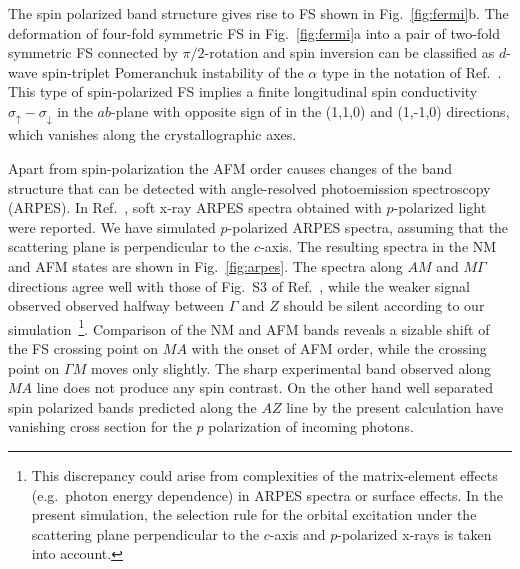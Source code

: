 \documentclass[reprint,twocolumn,superscriptaddress,secnumarabic,amssymb, nobibnotes, aps, prb]{revtex4-1}
\begin{document}
The spin polarized band structure gives rise to FS shown
in Fig.~\ref{fig:fermi}b. The deformation of four-fold symmetric FS
in Fig.~\ref{fig:fermi}a into a pair of two-fold symmetric FS connected
by $\pi/2$-rotation and spin inversion can be classified as
$d$-wave spin-triplet Pomeranchuk instability of the $\alpha$ 
type in the notation of Ref.~. This type of spin-polarized FS
implies a finite longitudinal spin conductivity $\sigma_{\uparrow}-\sigma_{\downarrow}$ in the $ab$-plane with opposite sign of in the (1,1,0) and (1,-1,0) directions, which vanishes
along the crystallographic axes.

Apart from spin-polarization the AFM order causes changes of the band structure that can be detected with angle-resolved photoemission spectroscopy (ARPES). In Ref.~, soft x-ray ARPES spectra obtained with $p$-polarized light were reported. We have simulated $p$-polarized ARPES spectra, assuming that the scattering plane is perpendicular to the $c$-axis. The resulting spectra in the NM and AFM states are shown in Fig.~\ref{fig:arpes}. The spectra along $AM$ and $M\Gamma$ directions agree well with those of Fig.~S3 of Ref.~, while the weaker signal observed observed halfway between $\Gamma$ and $Z$ should be silent according to our simulation~\footnote{This discrepancy could arise from complexities of the matrix-element effects (e.g.~photon energy dependence) in ARPES spectra or surface effects. In the present simulation, the selection rule for the orbital excitation under the scattering plane perpendicular to the $c$-axis and $p$-polarized x-rays is taken into account.}. Comparison of the NM and AFM bands reveals a sizable shift of the FS crossing point on $MA$ with the onset of AFM order, while the crossing point on $\Gamma M$ moves only slightly. The sharp experimental band observed along $MA$ line does not produce any spin contrast. On the other hand well separated spin polarized bands predicted along the $AZ$ line by the present calculation have vanishing cross section for
the $p$ polarization of incoming photons.
\end{document}
